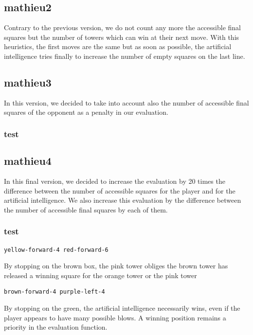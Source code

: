 \documentclass[a4paper, 11pt]{article}
\begin{document}
\subsection{mathieu2}
Contrary to the previous version, we do not count any more the accessible final squares but the number of towers which can win at their next move. 
With this heuristics, the first moves are the same but as soon as possible, the artificial intelligence tries finally to increase the number of empty squares on the last line.

\subsection{mathieu3}
In this version, we decided to take into account also the number of accessible final squares of the opponent as a penalty in our evaluation.

\subsubsection{test}

\subsection{mathieu4}
In this final version, we decided to increase the evaluation by 20 times the difference between the number of accessible squares for the player and for the artificial intelligence. We also increase this evaluation by the difference between the number of accessible final squares by each of them.

\subsubsection{test}
\begin{verbatim}
yellow-forward-4 red-forward-6
\end{verbatim}
By stopping on the brown box, the pink tower obliges the brown tower has released a winning square for the orange tower or the pink tower
\begin{verbatim}
brown-forward-4 purple-left-4
\end{verbatim}
By stopping on the green, the artificial intelligence necessarily wins, even if the player appears to have many possible blows. A winning position remains a priority in the evaluation function.
\end{document}
